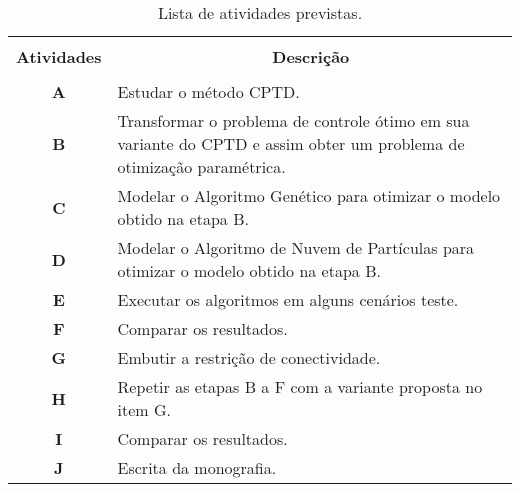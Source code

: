 \documentclass[tcc1,project]{uftex}
\begin{document}
\begin{table}[!h]
  \centering
  \caption{Lista de atividades previstas.}\label{tb:atividades}
  \begin{tabular}{cp{9.4cm}}
    \hline \hline &\\[-0.4cm]
    {\bf Atividades} & \multicolumn{1}{c}{\bf Descrição} \\
    \hline
    &\\[-0.4cm]
    \textbf{A} &  Estudar o método CPTD. \\[0.2cm]
    \textbf{B} &  Transformar o problema de controle ótimo em sua variante do CPTD e assim obter um problema de otimização paramétrica.\\[0.2cm]
    \textbf{C} &  Modelar o Algoritmo Genético para otimizar o modelo obtido na etapa B.\\[0.2cm]
    \textbf{D} &  Modelar o Algoritmo de Nuvem de Partículas para otimizar o modelo obtido na etapa B. \\[0.2cm]
    \textbf{E} &  Executar os algoritmos em alguns cenários teste. \\[0.2cm]
    \textbf{F} &  Comparar os resultados.\\[0.2cm]
    \textbf{G} &  Embutir a restrição de conectividade.\\[0.2cm]
    \textbf{H} &  Repetir as etapas B a F com a variante proposta no item G. \\[0.2cm]
    \textbf{I} &  Comparar os resultados. \\[0.2cm]
    \textbf{J} &  Escrita da monografia. \\[0.2cm]
    \hline \hline
  \end{tabular}
\end{table}



\end{document}
